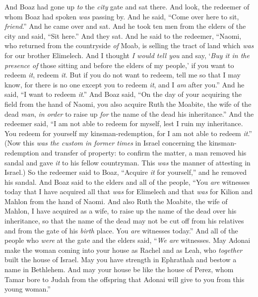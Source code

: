 \begin{biblechapter} %
 And Boaz had gone up \textit{to} the \textit{city} gate and sat there. And look, the redeemer of whom Boaz had spoken \textit{was} passing by. And he said, “Come over here to sit, \textit{friend}.” And he came over and sat.
\verse And he took ten men from the elders of the city and said, “Sit here.” And they sat.
\verse And he said to the redeemer, “Naomi, who returned from the countryside \textit{of} Moab, is selling the tract of land which \textit{was} for our brother Elimelech.
\verse And I thought \textit{I would tell you} and say, ‘\textit{Buy it in the presence of} those sitting and before the elders of my people,’ if you want to redeem \textit{it}, redeem \textit{it}. But if you do not want to redeem, tell me so that I may know, for there is no one except you to redeem \textit{it}, and I \textit{am} after you.” And he said, “I want to redeem \textit{it}.”
\verse And Boaz said, “On the day of your acquiring the field from the hand of Naomi, you also acquire Ruth the Moabite, the wife of the dead \textit{man}, \textit{in order} to raise up \textit{for} the name of the dead his inheritance.”
\verse And the redeemer said, “I am not able to redeem for myself, lest I ruin my inheritance. You redeem for yourself my kinsman-redemption, for I am not able to redeem \textit{it}.”
\verse (Now this \textit{was the custom in former times} in Israel concerning the kinsman-redemption and transfer of property: to confirm the matter, a man removed his sandal and gave \textit{it} to his fellow countryman. This \textit{was} the manner of attesting in Israel.)
\verse So the redeemer said to Boaz, “Acquire \textit{it} for yourself,” and he removed his sandal.
\verse And Boaz said to the elders and all of the people, “You \textit{are} witnesses today that I have acquired all that \textit{was} for Elimelech and that \textit{was} for Kilion and Mahlon from the hand of Naomi.
\verse And also Ruth the Moabite, the wife of Mahlon, I have acquired as a wife, to raise up the name of the dead over his inheritance, so that the name of the dead may not be cut off from his relatives and from the gate of his \textit{birth} place. You \textit{are} witnesses today.”
\verse And all of the people who \textit{were} at the gate and the elders said, “\textit{We are} witnesses. May Adonai make the woman coming into your house as Rachel and as Leah, who \textit{together} built the house of Israel. May you have strength in Ephrathah and bestow a name in Bethlehem.
\verse And may your house be like the house of Perez, whom Tamar bore to Judah from the offspring that Adonai will give to you from this young woman.”

\end{biblechapter}
